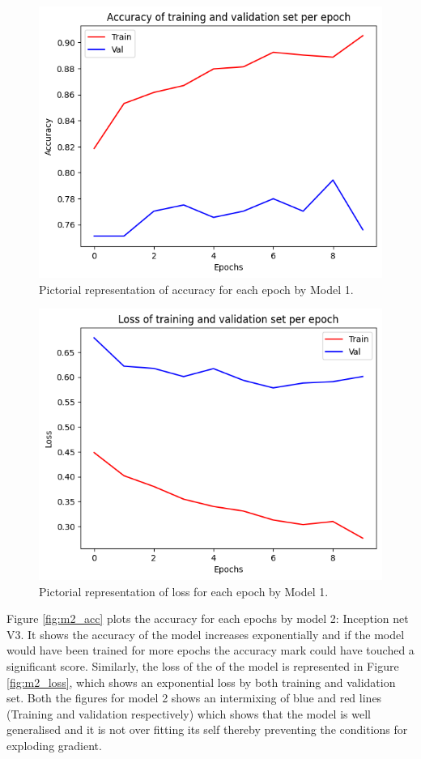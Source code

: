\documentclass[12pt, a4paper,twoside]{report}
\theoremstyle{plain} %
\theoremstyle{definition} %
\theoremstyle{remark} %
\numberwithin{equation}{chapter}
\begin{document}
\begin{figure}[h]
    \centering
    \includegraphics[scale=0.6]{Model1_acc.png}
    \caption{Pictorial representation of accuracy for each epoch by Model 1.}
    \label{fig:m1_acc}
\end{figure}

\begin{figure}[h]
    \centering
    \includegraphics[scale=0.6]{Model1_loss.png}
    \caption{Pictorial representation of loss for each epoch by Model 1.}
    \label{fig:m1_loss}
\end{figure}

Figure \ref{fig:m2_acc} plots the accuracy for each epochs by model 2: Inception net V3. It shows the accuracy of the model increases exponentially and if the model would have been trained for more epochs the accuracy mark could have touched a significant score. Similarly, the loss of the of the model is represented in  Figure \ref{fig:m2_loss}, which shows an exponential loss by both training and validation set. Both the figures for model 2 shows an intermixing of blue and red lines (Training and validation respectively) which shows that the model is well generalised and it is not over fitting its self thereby preventing the conditions for exploding gradient. 
\end{document}
